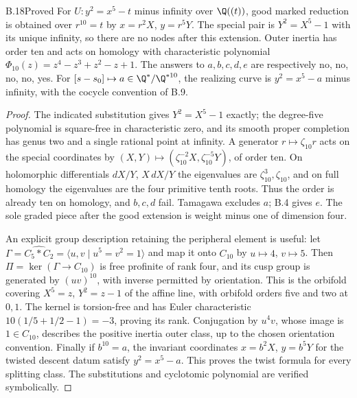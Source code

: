 \begin{claim}{B.18}{Proved}
For $U:y^2=x^5-t$ minus infinity over $\Q((t))$, good marked reduction is
obtained over $r^{10}=t$ by $x=r^2X$, $y=r^5Y$. The special pair is
$Y^2=X^5-1$ with its unique infinity, so there are no nodes after this
extension. Outer inertia has order ten and acts on homology with
characteristic polynomial $\Phi_{10}(z)=z^4-z^3+z^2-z+1$.
The answers to $a,b,c,d,e$ are respectively no, no, no, no, yes.
For $[s-s_0]\mapsto a\in\Q^*/\Q^{*10}$, the realizing curve is
$y^2=x^5-a$ minus infinity, with the cocycle convention of B.9.
\end{claim}
\begin{proof}
The indicated substitution gives $Y^2=X^5-1$ exactly; the degree-five
polynomial is square-free in characteristic zero, and its smooth proper
completion has genus two and a single rational point at infinity.
A generator $r\mapsto\zeta_{10}r$ acts on the special coordinates by
$(X,Y)\mapsto(\zeta_{10}^{-2}X,\zeta_{10}^{-5}Y)$, of order ten.
On holomorphic differentials $dX/Y$, $X\,dX/Y$ the eigenvalues are
$\zeta_{10}^3,\zeta_{10}$, and on full homology the eigenvalues are the
four primitive tenth roots. Thus the order is already ten on homology,
and $b,c,d$ fail. Tamagawa excludes $a$; B.4 gives $e$.
The sole graded piece after the good extension is weight minus one of
dimension four.

An explicit group description retaining the peripheral element is useful:
let $\Gamma=\widehat{C_5*C_2}=\langle u,v\mid u^5=v^2=1\rangle$ and map
it onto $C_{10}$ by $u\mapsto4$, $v\mapsto5$. Then
$\Pi=\ker(\Gamma\to C_{10})$ is free profinite of rank four, and its
cusp group is generated by $(uv)^{10}$, with inverse permitted by orientation.
This is the orbifold covering $X^5=z$, $Y^2=z-1$ of the affine line, with
orbifold orders five and two at $0,1$. The kernel is torsion-free and has
Euler characteristic $10(1/5+1/2-1)=-3$, proving its rank. Conjugation by
$u^4v$, whose image is $1\in C_{10}$, describes the positive inertia outer
class, up to the chosen orientation convention. Finally if $b^{10}=a$,
the invariant coordinates $x=b^2X$, $y=b^5Y$ for the twisted descent datum
satisfy $y^2=x^5-a$. This proves the twist formula for every splitting class.
The substitutions and cyclotomic polynomial are verified symbolically.
\end{proof}


